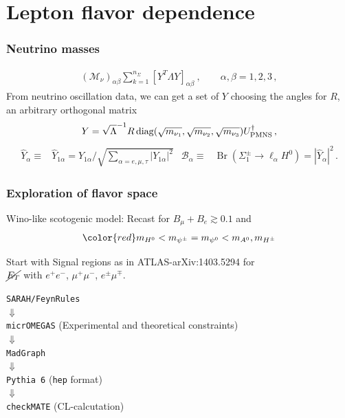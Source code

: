 \documentclass[%
xcolor=dvipsnames,table%
]{beamer}
\begin{document}
\section{Lepton flavor dependence}
\begin{frame}
  \frametitle{Neutrino masses}
  

\begin{align*}
  ({\mathcal{M}}_{\nu})_{\alpha\beta} 
\sum_{k=1}^{n_\Sigma} \left[Y^T \Lambda Y\right]_{\alpha\beta}~, \qquad  \alpha,\beta=1,2,3\,,
\end{align*}
From neutrino oscillation data, we can get a set of $Y$ choosing the angles for $R$, an arbitrary orthogonal matrix
\begin{eqnarray}\label{eq:CasasIbarra}
Y = \sqrt{\Lambda}^{-1} R  
\operatorname{diag}( \sqrt{m_{\nu_{1}}}, \sqrt{m_{\nu_{2}}},\sqrt{m_{\nu_{3}}}  )
U_{\rm PMNS}^{\dagger}
\,,
\end{eqnarray}
\begin{align*}
\hat Y_{\alpha }  \equiv&\hat Y_{1\alpha} = {Y_{1\alpha}}/{ \sqrt{\sum_{\alpha=e,\mu,\tau} |Y_{1\alpha}|^2 }} &  \mathcal{B}_\alpha \equiv &\operatorname{Br} (\Sigma_{1}^{\pm} \to \ell_\alpha H^{0}) = |\hat Y_\alpha|^2\,.  
\end{align*}
\end{frame}

\begin{frame}
  \frametitle{Exploration of flavor space}
\alert{Wino-like scotogenic model}: Recast for \alert{$B_{\mu}+B_e \gtrsim 0.1$} and
\begin{align*}
\color{red}  m_{H^0}<m_{\psi^{\pm}}= m_{\psi^{0}}<m_{A^0},m_{H^{\pm}}
\end{align*}

\vspace{-0.3cm}

Start with Signal regions as in ATLAS-arXiv:1403.5294 for\\


 $\cancel{E_T}$ with $e^+ e^-$, $\mu^+\mu^-$,
 $e^{\pm}\mu^{\mp}$. 

\centering
\texttt{SARAH/FeynRules} \\
$\Downarrow$\\
\texttt{micrOMEGAS} (Experimental and theoretical constraints) \\
$\Downarrow$\\
\texttt{MadGraph}\\
$\Downarrow$\\
\texttt{Pythia 6} (\texttt{hep} format)\\ 
$\Downarrow$\\
\texttt{checkMATE} (CL-calcutation)
\end{frame}
\end{document}
